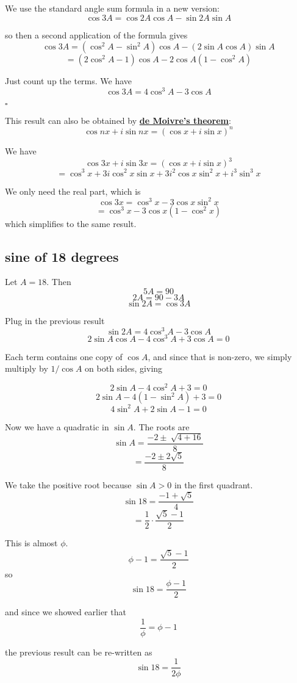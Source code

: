 \documentclass[11pt, oneside]{article}
\begin{document}
We use the standard angle sum formula in a new version:
\[ \cos 3A = \cos 2A \cos A - \sin 2A \sin A \]

so then a second application of the formula gives
\[ \cos 3A = (\cos^2 A - \sin^2 A) \cos A - (2 \sin A \cos A) \sin A \]
\[ = (2 \cos^2 A - 1) \cos A - 2 \cos A (1 - \cos^2A) \]

Just count up the terms.  We have
\[ \cos 3A = 4 \cos^3 A - 3 \cos A \]

$\square$

This result can also be obtained by \hyperref[sec:de_Moivre_theorem]{\textbf{de Moivre's theorem}}:
\[ \cos nx + i \sin nx = (\cos x + i \sin x)^n \]

We have
\[ \cos 3x + i \sin 3x = (\cos x + i \sin x)^3 \]
\[ = \cos^3 x + 3i \cos^2 x \sin x + 3i^2 \cos x \sin^2 x + i^3 \sin^3 x \]

We only need the real part, which is
\[ \cos 3x = \cos^3 x - 3 \cos x \sin^2 x \]
\[ = \cos^3 x - 3 \cos x (1 - \cos^2 x) \]
which simplifies to the same result.

\subsection*{sine of 18 degrees}

Let $A = 18$.  Then
\[ 5A = 90 \]
\[ 2A = 90 - 3A \]
\[ \sin 2A = \cos 3A \]

Plug in the previous result
\[ \sin 2A =  4 \cos^3 A - 3 \cos A \]
\[ 2 \sin A \cos A - 4 \cos^3 A + 3 \cos A = 0 \]

Each term contains one copy of $\cos A$, and since that is non-zero, we simply multiply by $1/\cos A$ on both sides, giving

\[ 2 \sin A - 4 \cos^2 A + 3 = 0 \]
\[ 2 \sin A - 4 (1 - \sin^2 A) + 3 = 0 \]
\[ 4 \sin^2A + 2 \sin A - 1 = 0 \]

Now we have a quadratic in $\sin A$.  The roots are
\[ \sin A = \frac{-2 \pm \ \sqrt{4 + 16}}{8} \]
\[ = \frac{-2 \pm 2 \sqrt{5}}{8} \]

We take the positive root because $\sin A > 0$ in the first quadrant.
\[ \sin 18 = \frac{-1 + \sqrt{5}}{4} \]
\[ = \frac{1}{2} \cdot \frac{\sqrt{5} - 1}{2} \]

This is almost $\phi$.
\[ \phi - 1 = \frac{\sqrt{5} - 1}{2} \]
so
\[ \sin 18 = \frac{\phi - 1}{2} \]

and since we showed earlier that
\[ \frac{1}{\phi} = \phi - 1 \]

the previous result can be re-written as
\[ \sin 18 =  \frac{1}{2 \phi} \]
\end{document}
